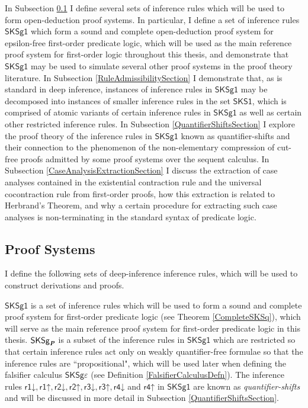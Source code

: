 \documentclass[10pt]{article}
\theoremstyle{definition}\newtheorem{remark}[theorem]{Remark}
\theoremstyle{definition}\newtheorem{example}[theorem]{Example}
\theoremstyle{definition}\newtheorem{definition}[theorem]{Definition}
\newcommand{\SKSProp}{{\mathsf{SKSg}_{\textbf{\textit{P}}}}}
\newcommand{\SKSq}{{\mathsf{SKSg1}}}
\newcommand{\SKSqDecomp}{{\mathsf{SKS1}}}
\newcommand{\FalsifierCalculus}{{\mathsf{SKSg\varepsilon}}}
\newcommand{\rOneUp}{{\mathsf{r1\mathord\uparrow}}}
\newcommand{\rOneDown}{{\mathsf{r1\mathord\downarrow}}}
\newcommand{\rTwoUp}{{\mathsf{r2\mathord\uparrow}}}
\newcommand{\rTwoDown}{{\mathsf{r2\mathord\downarrow}}}
\newcommand{\rThreeUp}{{\mathsf{r3\mathord\uparrow}}}
\newcommand{\rThreeDown}{{\mathsf{r3\mathord\downarrow}}}
\newcommand{\rFourUp}{{\mathsf{r4\mathord\uparrow}}}
\newcommand{\rFourDown}{{\mathsf{r4\mathord\downarrow}}}
\begin{document}
	In Subsection \ref{ProofSystemsSection} I define several sets of inference rules which will be used to form open-deduction proof systems. In particular, I define a set of inference rules $\SKSq$ which form a sound and complete open-deduction proof system for epsilon-free first-order predicate logic, which will be used as the main reference proof system for first-order logic throughout this thesis, and demonstrate that $\SKSq$ may be used to simulate several other proof systems in the proof theory literature. In Subsection \ref{RuleAdmissibilitySection} I demonstrate that, as is standard in deep inference, instances of inference rules in $\SKSq$ may be decomposed into instances of smaller inference rules in the set $\SKSqDecomp$, which is comprised of atomic variants of certain inference rules in $\SKSq$ as well as certain other restricted inference rules. In Subsection \ref{QuantifierShiftsSection} I explore the proof theory of the inference rules in $\SKSq$ known as quantifier-shifts and their connection to the phenomenon of the non-elementary compression of cut-free proofs admitted by some proof systems over the sequent calculus. In Subsection \ref{CaseAnalysisExtractionSection} I discuss the extraction of case analyses contained in the existential contraction rule and the universal cocontraction rule from first-order proofs, how this extraction is related to Herbrand's Theorem, and why a certain procedure for extracting such case analyses is non-terminating in the standard syntax of predicate logic.
	
	\subsection{Proof Systems}\label{ProofSystemsSection}
	
	I define the following sets of deep-inference inference rules, which will be used to construct derivations and proofs.
	
	$\SKSq$ is a set of inference rules which will be used to form a sound and complete proof system for first-order predicate logic (see Theorem \ref{CompleteSKSq}), which will serve as the main reference proof system for first-order predicate logic in this thesis. $\SKSProp$ is a subset of the inference rules in $\SKSq$ which are restricted so that certain inference rules act only on weakly quantifier-free formulae so that the inference rules are ``propositional", which will be used later when defining the falsifier calculus $\FalsifierCalculus$ (see Definition \ref{FalsifierCalculusDefn}). The inference rules $\rOneDown, \rOneUp, \rTwoDown, \rTwoUp, \rThreeDown, \rThreeUp, \rFourDown$ and $\rFourUp$ in $\SKSq$ are known as \textit{quantifier-shifts} and will be discussed in more detail in Subsection \ref{QuantifierShiftsSection}.
	
\end{document}
